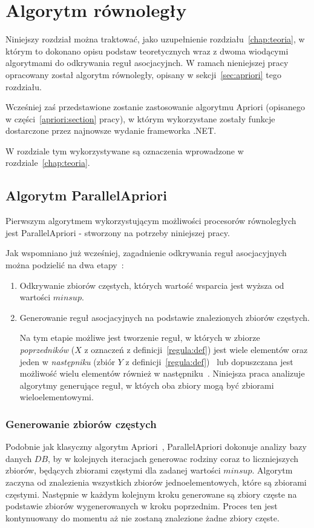 \chapter{Algorytm równoległy\label{chap:alg_rownolegly}}

Niniejszy rozdział można traktować, jako uzupełnienie rozdziału~\ref{chap:teoria}, w którym to dokonano opisu podstaw teoretycznych wraz z dwoma wiodącymi algorytmami do odkrywania reguł asocjacyjnch. W ramach nieniejszej pracy opracowany został algorytm równoległy, opisany w sekcji~\ref{sec:apriori} tego rozdziału.

Wcześniej zaś przedstawione zostanie zastosowanie algorytmu Apriori (opisanego w części~\ref{apriori:section} pracy), w którym wykorzystane zostały funkcje dostarczone przez najnowsze wydanie frameworka .NET. 

W rozdziale tym wykorzystywane są oznaczenia wprowadzone w rozdziale~\ref{chap:teoria}.

\section{Algorytm ParallelApriori\label{sec:papriori}}
Pierwszym algorytmem wykorzystującym możliwości procesorów równoległych jest ParallelApriori - stworzony na potrzeby niniejszej pracy. 

Jak wspomniano już wcześniej, zagadnienie odkrywania reguł asocjacyjnych można podzielić na dwa etapy~\cite{Problem:Statement}:
\begin{enumerate}
	\item Odkrywanie zbiorów częstych, których wartość wsparcia jest wyższa od wartości $minsup$.
	\item Generowanie reguł asocjacyjnych na podstawie znalezionych zbiorów częstych.

	Na tym etapie możliwe jest tworzenie reguł, w których w zbiorze \emph{poprzedników} ($X$ z oznaczeń z definicji~\ref{regula:def}) jest wiele elementów oraz jeden w \emph{następniku} (zbiór $Y$ z definicji~\ref{regula:def})~\cite{Problem:Statement} lub dopuszczana jest możliwość wielu elementów również w następniku~\cite{Apriori:Main}. Niniejsza praca analizuje algorytmy generujące reguł, w któych oba zbiory mogą być zbiorami wieloelementowymi.
\end{enumerate}

\subsection{Generowanie zbiorów częstych}\label{papriori:gen}
Podobnie jak klasyczny algorytm Apriori~\cite{Apriori:Main}, ParallelApriori dokonuje analizy bazy danych $DB$, by w kolejnych iteracjach generowac rodziny coraz to liczniejszych zbiorów, będących zbiorami częstymi dla zadanej wartości $minsup$. Algorytm zaczyna od znalezienia wszystkich zbiorów jednoelementowych, które są zbiorami częstymi. Następnie w każdym kolejnym kroku generowane są zbiory częste na podstawie zbiorów wygenerowanych w kroku poprzednim. Proces ten jest kontynuowany do momentu aż nie zostaną znalezione żadne zbiory częste.

